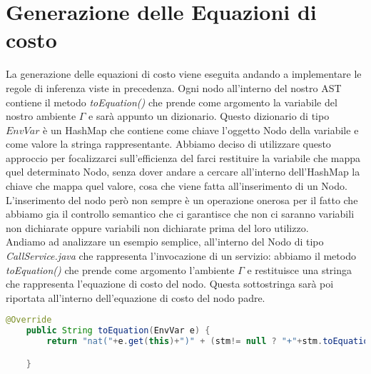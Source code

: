 \documentclass[../../main.tex]{subfiles}
\begin{document}
\section{Generazione delle Equazioni di costo}
\label{sec:costEquation}
La generazione delle equazioni di costo viene eseguita andando a implementare le regole di inferenza viste in precedenza.
Ogni nodo all'interno del nostro AST contiene il metodo \textit{toEquation()} che prende come argomento la variabile del nostro ambiente $\varGamma$ e sarà appunto un dizionario.
Questo dizionario di tipo $EnvVar$ è un HashMap che contiene come chiave l'oggetto Nodo della variabile e come valore la stringa rappresentante.
Abbiamo deciso di utilizzare questo approccio per focalizzarci sull'efficienza del farci restituire la variabile che mappa quel determinato Nodo, senza dover andare a cercare all'interno dell'HashMap la chiave che mappa quel valore, cosa che viene fatta all'inserimento di un Nodo.
L'inserimento del nodo però non sempre è un operazione onerosa per il fatto che abbiamo gia il controllo semantico che ci garantisce che non ci saranno variabili non dichiarate oppure variabili non dichiarate prima del loro utilizzo.\\
Andiamo ad analizzare un esempio semplice, all'interno del Nodo di tipo \textit{CallService.java} che rappresenta l'invocazione di un servizio: abbiamo il metodo \textit{toEquation()} che prende come argomento l'ambiente $\varGamma$ e restituisce una stringa che rappresenta l'equazione di costo del nodo. Questa sottostringa sarà poi riportata all'interno dell'equazione di costo del nodo padre.
\newpage
\begin{lstlisting}[language=Java]
    @Override
    public String toEquation(EnvVar e) {
        return "nat("+e.get(this)+")" + (stm!= null ? "+"+stm.toEquation(e) : "");

    }
\end{lstlisting}
\end{document}
